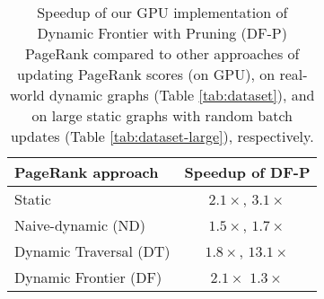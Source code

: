 \begin{table}[hbtp]
  \centering
  \caption{Speedup of our GPU implementation of Dynamic Frontier with Pruning (DF-P) PageRank compared to other approaches of updating PageRank scores (on GPU), on real-world dynamic graphs (Table \ref{tab:dataset}), and on large static graphs with random batch updates (Table \ref{tab:dataset-large}), respectively.}
  \label{tab:compare}
  \begin{tabular}{|l||c|}
    \toprule
    \textbf{PageRank approach} &
    \textbf{Speedup of DF-P} \\
    \midrule
    Static \cite{rank-page99} & $2.1\times$, $3.1\times$ \\ \hline
    Naive-dynamic (ND) \cite{rank-page99, rank-zhang17} & $1.5\times$, $1.7\times$ \\ \hline
    Dynamic Traversal (DT) \cite{rank-desikan05, kim2015incremental, rank-giri20, sahu2022dynamic} & $1.8\times$, $13.1\times$ \\ \hline
    Dynamic Frontier (DF) \cite{sahu2024df} & $2.1\times$ $1.3\times$ \\ \hline
  \bottomrule
  \end{tabular}
\end{table}
